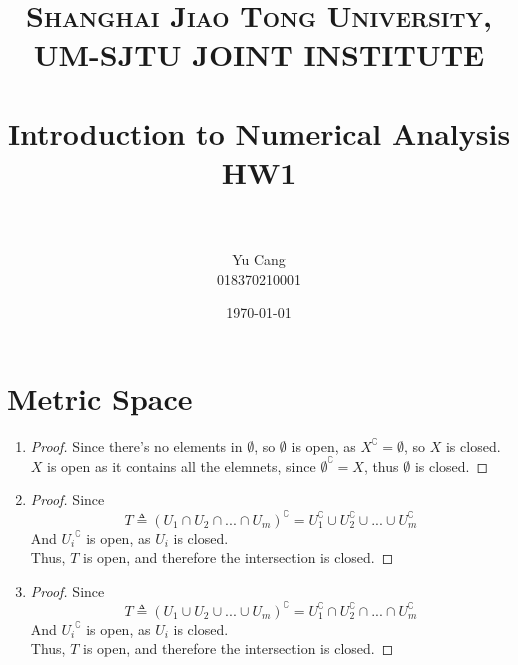 \documentclass[paper=a4, fontsize=11pt]{scrartcl} %
\title{	
\normalfont \normalsize 
\textsc{Shanghai Jiao Tong University, UM-SJTU JOINT INSTITUTE} \\ [25pt] %
\horrule{0.5pt} \\[0.4cm] %
\huge Introduction to Numerical Analysis \\ HW1 \\ %
\horrule{2pt} \\[0.5cm] %
}
\author{Yu Cang \\ 018370210001} %
\date{\normalsize \today} %
\numberwithin{equation}{section} %
\numberwithin{figure}{section} %
\numberwithin{table}{section} %
\begin{document}
\maketitle %


\section{Metric Space}
\begin{enumerate}
	\item
		\begin{proof}
			Since there's no elements in $\emptyset$, so $\emptyset$ is open, as $X^\complement = \emptyset$, so $X$ is closed.\\
			$X$ is open as it contains all the elemnets, since $\emptyset^\complement = X$, thus $\emptyset$ is closed. 
		\end{proof}
	\item
		\begin{proof}
			Since
			\begin{equation}
				T \triangleq (U_1 \cap U_2 \cap ... \cap U_m)^\complement = U_1^\complement \cup U_2^\complement \cup ... \cup U_m^\complement
			\end{equation}
			And ${U_i}^\complement$ is open, as $U_i$ is closed.\\
			Thus, $T$ is open, and therefore the intersection is closed. 
		\end{proof}
	\item 
		\begin{proof}
			Since
			\begin{equation}
				T \triangleq (U_1 \cup U_2 \cup ... \cup U_m)^\complement = U_1^\complement \cap U_2^\complement \cap ... \cap U_m^\complement
			\end{equation}
			And ${U_i}^\complement$ is open, as $U_i$ is closed.\\
			Thus, $T$ is open, and therefore the intersection is closed. 
		\end{proof}

\end{enumerate}


\end{document}
